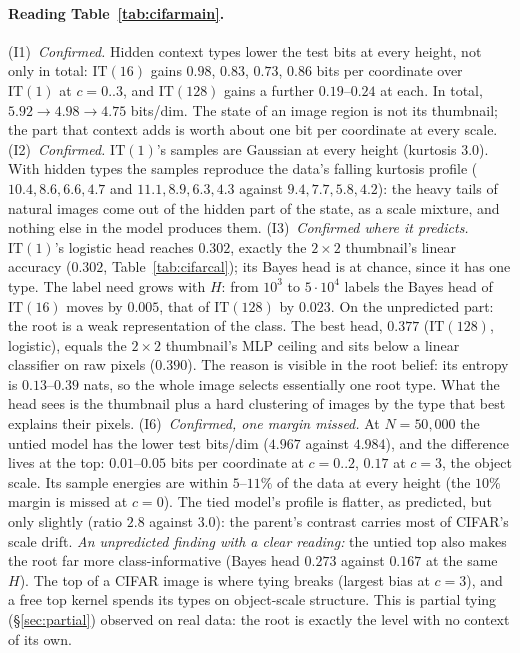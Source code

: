 \documentclass[11pt]{article}
\theoremstyle{definition}
\begin{document}
\paragraph{Reading Table~\ref{tab:cifarmain}.}
(I1)~\emph{Confirmed.} Hidden context types lower the test bits at every height, not only in total:
$\mathrm{IT}(16)$ gains $0.98$, $0.83$, $0.73$, $0.86$ bits per coordinate over $\mathrm{IT}(1)$ at $c=0..3$, and
$\mathrm{IT}(128)$ gains a further $0.19$--$0.24$ at each. In total, $5.92\to4.98\to4.75$ bits/dim. The state of an
image region is not its thumbnail; the part that context adds is worth about one bit per coordinate at every
scale.
(I2)~\emph{Confirmed.} $\mathrm{IT}(1)$'s samples are Gaussian at every height (kurtosis $3.0$). With hidden types the
samples reproduce the data's falling kurtosis profile ($10.4,8.6,6.6,4.7$ and $11.1,8.9,6.3,4.3$ against
$9.4,7.7,5.8,4.2$): the heavy tails of natural images come out of the hidden part of the state, as a scale
mixture, and nothing else in the model produces them.
(I3)~\emph{Confirmed where it predicts.} $\mathrm{IT}(1)$'s logistic head reaches $0.302$, exactly the $2\times2$
thumbnail's linear accuracy ($0.302$, Table~\ref{tab:cifarcal}); its Bayes head is at chance, since it has one
type. The label need grows with $H$: from $10^3$ to $5\cdot10^4$ labels the Bayes head of $\mathrm{IT}(16)$ moves by
$0.005$, that of $\mathrm{IT}(128)$ by $0.023$. On the unpredicted part: the root is a weak representation of the
class. The best head, $0.377$ ($\mathrm{IT}(128)$, logistic), equals the $2\times2$ thumbnail's MLP ceiling and sits
below a linear classifier on raw pixels ($0.390$). The reason is visible in the root belief: its entropy is
$0.13$--$0.39$ nats, so the whole image selects essentially one root type. What the head sees is the thumbnail
plus a hard clustering of images by the type that best explains their pixels.
(I6)~\emph{Confirmed, one margin missed.} At $N=50{,}000$ the untied model has the lower test bits/dim
($4.967$ against $4.984$), and the difference lives at the top: $0.01$--$0.05$ bits per coordinate at $c=0..2$,
$0.17$ at $c=3$, the object scale. Its sample energies are within $5$--$11\%$ of the data at every height (the
$10\%$ margin is missed at $c=0$). The tied model's profile is flatter, as predicted, but only slightly
(ratio $2.8$ against $3.0$): the parent's contrast carries most of CIFAR's scale drift.
\emph{An unpredicted finding with a clear reading:} the untied top also makes the root far more class-informative
(Bayes head $0.273$ against $0.167$ at the same $H$). The top of a CIFAR image is where tying breaks
(largest bias at $c=3$), and a free top kernel spends its types on object-scale structure. This is partial tying
(\S\ref{sec:partial}) observed on real data: the root is exactly the level with no context of its own.
\end{document}

